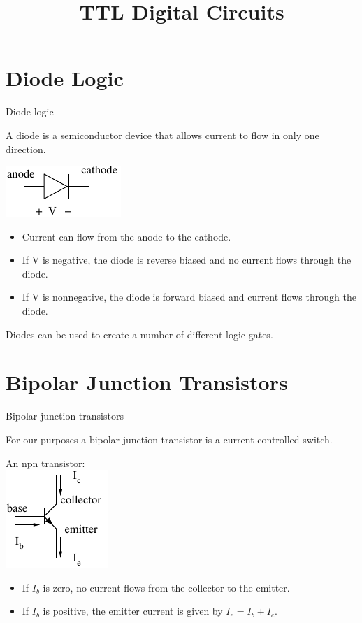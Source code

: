 \title{TTL Digital Circuits}


\section{Diode Logic}

\begin{frame}{Diode logic}
  \begin{definition}
    A \alert{diode} is a semiconductor device that allows current to flow in only one direction.
  \end{definition}
  \begin{center}
    \includegraphics{Diode}
  \end{center}
  \begin{itemize}
    \item Current can flow from the anode to the cathode.
    \item If V is negative, the diode is \alert{reverse biased} and no current flows through the diode.
    \item If V is nonnegative, the diode is \alert{forward biased} and current flows through the diode.
  \end{itemize}
  Diodes can be used to create a number of different logic gates.
\end{frame}

\section{Bipolar Junction Transistors}

\begin{frame}{Bipolar junction transistors}
  \begin{definition}
    For our purposes a \alert{bipolar junction transistor} is a current controlled switch.
  \end{definition}
  \begin{center}
    An npn transistor:\\
    \includegraphics{BipolarJunctionTransistor}
  \end{center}
  \begin{itemize}
    \item If $I_b$ is zero, no current flows from the collector to the emitter.
    \item If $I_b$ is positive, the emitter current is given by $I_e = I_b + I_c$.
  \end{itemize}
\end{frame}

